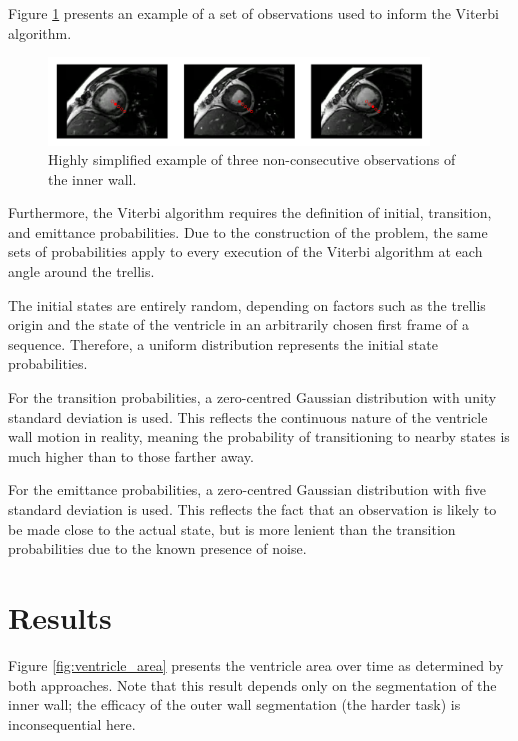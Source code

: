 Figure \ref{fig:viterbi_obs} presents an example of a set of observations used to inform the Viterbi algorithm.

\begin{figure}[ht]
  \centering
  \includegraphics[width=0.9\textwidth]{images/q1_viterbi_obs.png}
  \caption{Highly simplified example of three non-consecutive observations of the inner wall.}
  \label{fig:viterbi_obs}
\end{figure}

Furthermore, the Viterbi algorithm requires the definition of initial, transition, and emittance probabilities. Due to the construction of the problem, the same sets of probabilities apply to every execution of the Viterbi algorithm at each angle around the trellis.

The initial states are entirely random, depending on factors such as the trellis origin and the state of the ventricle in an arbitrarily chosen first frame of a sequence. Therefore, a uniform distribution represents the initial state probabilities.

For the transition probabilities, a zero-centred Gaussian distribution with unity standard deviation is used. This reflects the continuous nature of the ventricle wall motion in reality, meaning the probability of transitioning to nearby states is much higher than to those farther away.

For the emittance probabilities, a zero-centred Gaussian distribution with five standard deviation is used. This reflects the fact that an observation is likely to be made close to the actual state, but is more lenient than the transition probabilities due to the known presence of noise.

\section{Results}

Figure \ref{fig:ventricle_area} presents the ventricle area over time as determined by both approaches. Note that this result depends only on the segmentation of the inner wall; the efficacy of the outer wall segmentation (the harder task) is inconsequential here.

